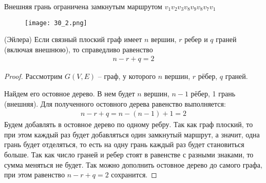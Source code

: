 Внешняя грань ограничена замкнутым маршрутом $v_1 v_2 v_3 v_8 v_9 v_8 v_7 v_1$
\begin{figure}[h]
    \centering
    \texttt{[image: 30\_2.png]}
\end{figure}

\begin{theorem}
    (Эйлера) Если связный плоский граф имеет $n$ вершин, $r$ ребер и $q$
    граней (включая внешнюю), то справедливо равенство
    \begin{align*}
        n-r+q=2
    \end{align*}
\end{theorem}

\begin{proof}
    Рассмотрим $G(V, E)$ -- граф, у которого $n$ вершин, $r$ рёбер, $q$
    граней.

    Найдем его остовное дерево. В нем будет $n$ вершин, $n - 1$ рёбер, 1 грань
    (внешняя). Для полученного остовного дерева равенство выполняется:
    \begin{align*}
        n-r+q=n-(n-1)+1=2
    \end{align*}
    Будем добавлять в остовное дерево по одному ребру. Так как граф плоский,
    то при этом каждый раз будет добавляться один замкнутый маршрут, а
    значит, одна грань будет отделяться, то есть на одну грань каждый раз будет
    становиться больше. Так как число граней и ребер стоят в равенстве с
    разными знаками, то сумма меняться не будет. Так можно дополнить
    остовное дерево до самого графа, при этом равенство $n - r + q = 2$
    сохранится.
\end{proof}